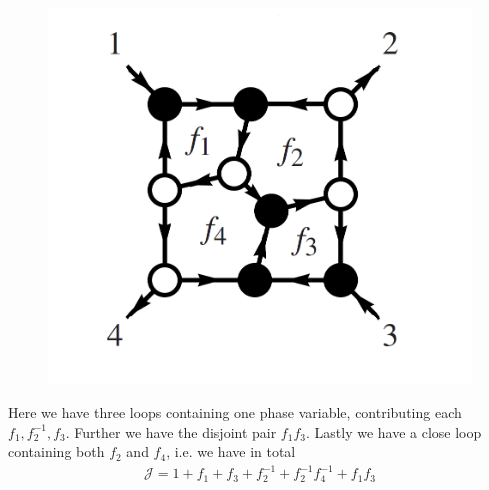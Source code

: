 \documentclass[letter,11pt]{article}
\begin{document}
\begin{figure}[H]
	\centering
	\includegraphics[width=0.3\linewidth]{Jexample}
	\caption{}
	\label{fig:jexample}
\end{figure}
Here we have three loops containing one phase variable, contributing each $f_1,f_2^{-1},f_{3}$. Further we have the disjoint pair $f_1f_3$. Lastly we have a close loop containing both $f_2$ and $f_4$, i.e. we have in total
\begin{equation}
	\begin{aligned}
		\mathcal{J}=1+f_1+f_3+f_2^{-1}+f_2^{-1}f_4^{-1}+f_1f_3
	\end{aligned}
\end{equation}
\end{document}
